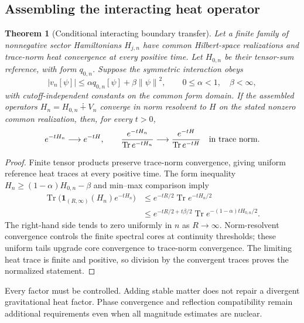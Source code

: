 \documentclass[11pt,a4paper,oneside]{book}
\theoremstyle{plain}
\newtheorem{theorem}{Theorem}[chapter]
\theoremstyle{definition}
\theoremstyle{remark}
\newcommand{\one}{\mathbf 1}
\newcommand{\Tr}{\operatorname{Tr}}
\newcommand{\norm}[1]{\left\lVert#1\right\rVert}
\newcommand{\src}[2]{\cite{#1}}
\begin{document}
\subsection{Assembling the interacting heat operator}
\begin{theorem}[Conditional interacting boundary transfer]
\label{thm:nuclearity}
Let a finite family of nonnegative sector Hamiltonians $H_{j,n}$ have
common Hilbert-space realizations and trace-norm heat convergence at
every positive time.  Let $H_{0,n}$ be their tensor-sum reference, with
form $q_{0,n}$.  Suppose the symmetric interaction obeys
\begin{equation}
 |v_n[\psi]|\le\alpha q_{0,n}[\psi]+\beta\norm{\psi}^2,
 \qquad 0\le\alpha<1,\quad \beta<\infty,
 \label{eq:relative-form}
\end{equation}
with cutoff-independent constants on the common form domain.  If the
assembled operators $H_n=H_{0,n}\dotplus V_n$ converge in norm resolvent
to $H$ on the stated nonzero common realization, then, for every $t>0$,
\begin{equation}
 e^{-tH_n}\longrightarrow e^{-tH},\qquad
 \frac{e^{-tH_n}}{\Tr e^{-tH_n}}\longrightarrow
 \frac{e^{-tH}}{\Tr e^{-tH}}
 \quad\hbox{in trace norm}.
 \label{eq:assembled-heat-convergence}
\end{equation}
\end{theorem}
\begin{proof}
Finite tensor products preserve trace-norm convergence, giving uniform
reference heat traces at every positive time.  The form inequality
$H_n\ge(1-\alpha)H_{0,n}-\beta$ and min--max comparison imply
\begin{equation}
 \begin{aligned}
 \Tr\bigl(\one_{(R,\infty)}(H_n)e^{-tH_n}\bigr)
 &\le e^{-tR/2}\Tr e^{-tH_n/2}\\
 &\le e^{-tR/2+t\beta/2}
        \Tr e^{-(1-\alpha)tH_{0,n}/2}.
 \end{aligned}
 \label{eq:assembled-heat-tail}
\end{equation}
The right-hand side tends to zero uniformly in $n$ as $R\to\infty$.
Norm-resolvent convergence controls the finite spectral cores at
continuity thresholds; these uniform tails upgrade core convergence to
trace-norm convergence.  The limiting heat trace is finite and positive,
so division by the convergent traces proves the normalized statement.
\end{proof}
\src{R15}{thm:v15v99-assembled}
Every factor must be controlled.  Adding stable matter does not repair a
divergent gravitational heat factor.  Phase convergence and reflection
compatibility remain additional requirements even when all magnitude
estimates are nuclear.
\end{document}
